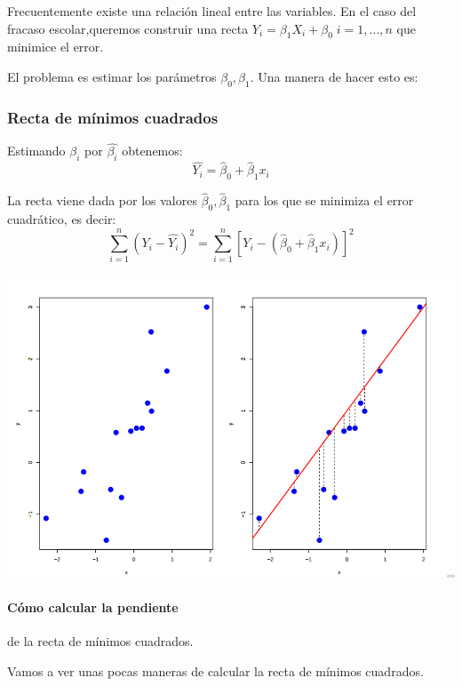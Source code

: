 Frecuentemente existe una relación lineal entre las variables. En el caso del fracaso escolar,queremos construir una recta $Y_i = β_1 X_i + β_0\; i=1,...,n$ que minimice el error.

El problema es estimar los parámetros $β_0,β_1$. Una manera de hacer esto es:

\subsubsection{Recta de mínimos cuadrados}

\begin{defn}
Estimando $β_i$ por $\hat{β_i}$ obtenemos: \[\hat{Y_i} = \hat{β}_0 + \hat{β}_1 x_i\]

La recta viene dada por los valores $\hat{β}_0, \hat{β}_1$ para los que se minimiza el error cuadrático, es decir:
\[\sum_{i=1}^n \left(Y_i - \hat{Y_i}\right)^2 =  \sum_{i=1}^n \left[ Y_i - (\hat{β}_0 + \hat{β}_1x_i) \right]^2\]
\end{defn}

\begin{example}
\begin{center}
\includegraphics[scale = 0.6]{img/ejemploRectaRegresionLineal.png}
\end{center}
\end{example}

\paragraph{Cómo calcular la pendiente} de la recta de mínimos cuadrados.


Vamos a ver unas pocas maneras de calcular la recta de mínimos cuadrados.

